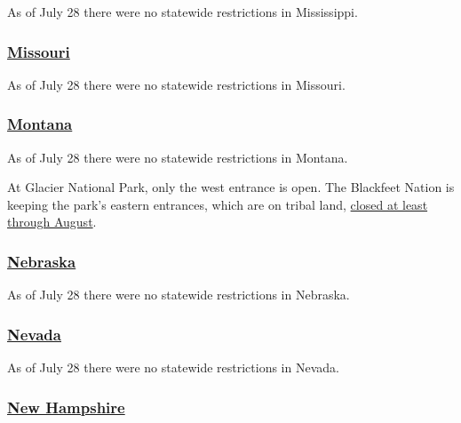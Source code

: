 As of July 28 there were no statewide restrictions in Mississippi.

\hypertarget{missouri}{%
\subsubsection{\texorpdfstring{\href{https://www.visitmo.com/travel-updates}{Missouri}}{Missouri}}\label{missouri}}

As of July 28 there were no statewide restrictions in Missouri.

\hypertarget{montana}{%
\subsubsection{\texorpdfstring{\href{https://www.visitmt.com/travel-alerts.html}{Montana}}{Montana}}\label{montana}}

As of July 28 there were no statewide restrictions in Montana.

At Glacier National Park, only the west entrance is open. The Blackfeet
Nation is keeping the park's eastern entrances, which are on tribal
land,
\href{https://www.washingtonpost.com/national/a-closed-border-pandemic-weary-tourists-and-a-big-bottleneck-at-glacier-national-park/2020/07/10/607694f2-c2c0-11ea-b4f6-cb39cd8940fb_story.html}{closed
at least through August}.

\hypertarget{nebraska}{%
\subsubsection{\texorpdfstring{\href{http://dhhs.ne.gov/Pages/COVID-19-Traveler-Recommendations.aspx}{Nebraska}}{Nebraska}}\label{nebraska}}

As of July 28 there were no statewide restrictions in Nebraska.

\hypertarget{nevada}{%
\subsubsection{\texorpdfstring{\href{https://nvhealthresponse.nv.gov/info/travelers-visitors/}{Nevada}}{Nevada}}\label{nevada}}

As of July 28 there were no statewide restrictions in Nevada.

\hypertarget{new-hampshire}{%
\subsubsection{\texorpdfstring{\href{https://www.covidguidance.nh.gov/out-state-visitors}{New
Hampshire}}{New Hampshire}}\label{new-hampshire}}

